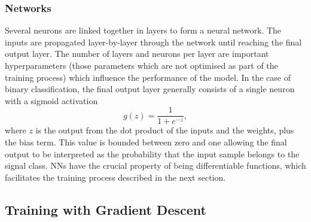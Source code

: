 \subsubsection{Networks}

Several neurons are linked together in layers to form a neural network.
The inputs are propagated layer-by-layer through the network until reaching the final output layer.
The number of layers and neurons per layer are important hyperparameters (those parameters which are not optimised as part of the training process) which influence the performance of the model.
In the case of binary classification, the final output layer generally consists of a single neuron with a sigmoid activation 
%
\begin{equation}\label{eq:sigmoid}
  g(z) = \frac{1}{1 + e^{-z}} ,
\end{equation}
%
where $z$ is the output from the dot product of the inputs and the weights, plus the bias term.
This value is bounded between zero and one allowing the final output to be interpreted as the probability that the input sample belongs to the signal class.
NNs have the crucial property of being differentiable functions, which facilitates the training process described in the next section.





\subsection{Training with Gradient Descent}\label{sec:training_sgd}

